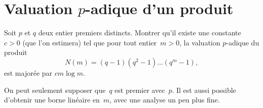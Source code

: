 \section{Valuation $p$-adique d'un produit}

Soit $p$ et $q$ deux entier premiers distincts. Montrer qu'il existe une constante $c > 0$ (que l'on estimera) tel que pour tout entier~$m>0$, la valuation $p$-adique du produit
\[ N(m)=(q-1)(q^2-1)\ldots(q^m-1), \]
est majorée par $cm\log m$.

\begin{em}
  On peut seulement supposer que~$q$ est premier avec~$p$. Il est aussi possible d'obtenir une borne linéaire en~$m$, avec une analyse un peu plus fine.
\end{em}

